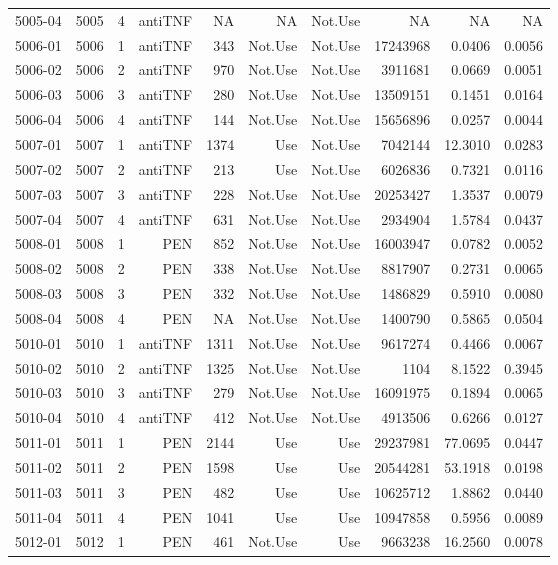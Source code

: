 {\begin{longtable}{ | r | r | r | r | r | r | r | r | r | r | }
5005-04 & 5005 & 4 & antiTNF & NA & NA & Not.Use & NA & NA & NA\\ 
5006-01 & 5006 & 1 & antiTNF & 343 & Not.Use & Not.Use & 17243968 & 0.0406 & 0.0056\\ 
5006-02 & 5006 & 2 & antiTNF & 970 & Not.Use & Not.Use & 3911681 & 0.0669 & 0.0051\\ 
5006-03 & 5006 & 3 & antiTNF & 280 & Not.Use & Not.Use & 13509151 & 0.1451 & 0.0164\\ 
5006-04 & 5006 & 4 & antiTNF & 144 & Not.Use & Not.Use & 15656896 & 0.0257 & 0.0044\\ 
5007-01 & 5007 & 1 & antiTNF & 1374 & Use & Not.Use & 7042144 & 12.3010 & 0.0283\\ 
5007-02 & 5007 & 2 & antiTNF & 213 & Use & Not.Use & 6026836 & 0.7321 & 0.0116\\ 
5007-03 & 5007 & 3 & antiTNF & 228 & Not.Use & Not.Use & 20253427 & 1.3537 & 0.0079\\ 
5007-04 & 5007 & 4 & antiTNF & 631 & Not.Use & Not.Use & 2934904 & 1.5784 & 0.0437\\ 
5008-01 & 5008 & 1 & PEN & 852 & Not.Use & Not.Use & 16003947 & 0.0782 & 0.0052\\ 
5008-02 & 5008 & 2 & PEN & 338 & Not.Use & Not.Use & 8817907 & 0.2731 & 0.0065\\ 
5008-03 & 5008 & 3 & PEN & 332 & Not.Use & Not.Use & 1486829 & 0.5910 & 0.0080\\ 
5008-04 & 5008 & 4 & PEN & NA & Not.Use & Not.Use & 1400790 & 0.5865 & 0.0504\\ 
5010-01 & 5010 & 1 & antiTNF & 1311 & Not.Use & Not.Use & 9617274 & 0.4466 & 0.0067\\ 
5010-02 & 5010 & 2 & antiTNF & 1325 & Not.Use & Not.Use & 1104 & 8.1522 & 0.3945\\ 
5010-03 & 5010 & 3 & antiTNF & 279 & Not.Use & Not.Use & 16091975 & 0.1894 & 0.0065\\ 
5010-04 & 5010 & 4 & antiTNF & 412 & Not.Use & Not.Use & 4913506 & 0.6266 & 0.0127\\ 
5011-01 & 5011 & 1 & PEN & 2144 & Use & Use & 29237981 & 77.0695 & 0.0447\\ 
5011-02 & 5011 & 2 & PEN & 1598 & Use & Use & 20544281 & 53.1918 & 0.0198\\ 
5011-03 & 5011 & 3 & PEN & 482 & Use & Use & 10625712 & 1.8862 & 0.0440\\ 
5011-04 & 5011 & 4 & PEN & 1041 & Use & Use & 10947858 & 0.5956 & 0.0089\\ 
5012-01 & 5012 & 1 & PEN & 461 & Not.Use & Use & 9663238 & 16.2560 & 0.0078\\ 

\end{longtable}}
